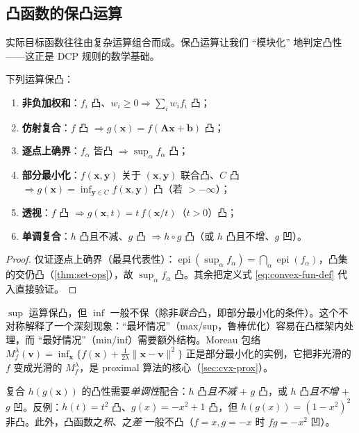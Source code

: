 \subsection{凸函数的保凸运算}
\label{subsec:cvx-fun-ops}

实际目标函数往往由复杂运算组合而成。保凸运算让我们 “模块化” 地判定凸性——这正是 DCP 规则的数学基础。

\begin{theorem}[凸函数的保凸运算]\label{thm:fun-ops}
下列运算保凸：
\begin{enumerate}
  \item \textbf{非负加权和}：$f_i$ 凸、$w_i\ge0\Rightarrow\sum_i w_i f_i$ 凸；
  \item \textbf{仿射复合}：$f$ 凸 $\Rightarrow g(\mathbf x)=f(\mathbf A\mathbf x+\mathbf b)$ 凸；
  \item \textbf{逐点上确界}：$f_\alpha$ 皆凸 $\Rightarrow\sup_\alpha f_\alpha$ 凸；
  \item \textbf{部分最小化}：$f(\mathbf x,\mathbf y)$ 关于 $(\mathbf x,\mathbf y)$ 联合凸、$C$ 凸 $\Rightarrow g(\mathbf x)=\inf_{\mathbf y\in C}f(\mathbf x,\mathbf y)$ 凸（若 $>-\infty$）；
  \item \textbf{透视}：$f$ 凸 $\Rightarrow g(\mathbf x,t)=t\,f(\mathbf x/t)$（$t>0$）凸；
  \item \textbf{单调复合}：$h$ 凸且不减、$g$ 凸 $\Rightarrow h\circ g$ 凸（或 $h$ 凸且不增、$g$ 凹）。
\end{enumerate}
\end{theorem}
\begin{proof}
仅证逐点上确界（最具代表性）：$\operatorname{epi}(\sup_\alpha f_\alpha)=\bigcap_\alpha\operatorname{epi}(f_\alpha)$，凸集的交仍凸（\cref{thm:set-ops}），故 $\sup_\alpha f_\alpha$ 凸。其余把定义式 \cref{eq:convex-fun-def} 代入直接验证。
\end{proof}

\begin{insight}\label{ins:sup-inf}
$\sup$ 运算保凸，但 $\inf$ 一般不保（除非\emph{联合}凸，即部分最小化的条件）。这个不对称解释了一个深刻现象：“最坏情况”（max/sup，鲁棒优化）容易在凸框架内处理，而 “最好情况”（min/inf）需要额外结构。Moreau 包络 $M_f^\lambda(\mathbf v)=\inf_{\mathbf x}\{f(\mathbf x)+\tfrac1{2\lambda}\|\mathbf x-\mathbf v\|^2\}$ 正是部分最小化的实例，它把非光滑的 $f$ 变成光滑的 $M_f^\lambda$，是 proximal 算法的核心（\cref{sec:cvx-prox}）。
\end{insight}

\begin{pitfall}
复合 $h(g(\mathbf x))$ 的凸性需要\emph{单调性}配合：$h$ 凸\emph{且不减} $+$ $g$ 凸，或 $h$ 凸\emph{且不增} $+$ $g$ 凹。反例：$h(t)=t^2$ 凸、$g(x)=-x^2+1$ 凸，但 $h(g(x))=(1-x^2)^2$ 非凸。此外，凸函数之\emph{积}、之\emph{差} 一般不凸（$f=x,g=-x$ 时 $fg=-x^2$ 凹）。
\end{pitfall}

